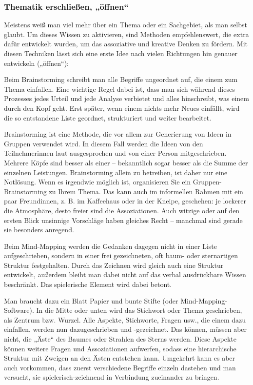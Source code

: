 \documentclass[]{article}
\begin{document}
\subsubsection{Thematik erschließen,
„öffnen``}\label{thematik-erschlieen-offnen}

Meistens weiß man viel mehr über ein Thema oder ein Sachgebiet, als man
selbst glaubt. Um dieses Wissen zu aktivieren, sind Methoden
empfehlenswert, die extra dafür entwickelt wurden, um das assoziative
und kreative Denken zu fördern. Mit diesen Techniken lässt sich eine
erste Idee nach vielen Richtungen hin genauer entwickeln („öffnen``):

Beim Brainstorming schreibt man alle Begriffe ungeordnet auf, die einem
zum Thema einfallen. Eine wichtige Regel dabei ist, dass man sich
während dieses Prozesses jedes Urteil und jede Analyse verbietet und
alles hinschreibt, was einem durch den Kopf geht. Erst später, wenn
einem nichts mehr Neues einfällt, wird die so entstandene Liste
geordnet, strukturiert und weiter bearbeitet.

Brainstorming ist eine Methode, die vor allem zur Generierung von Ideen
in Gruppen verwendet wird. In diesem Fall werden die Ideen von den
Teilnehmerinnen laut ausgesprochen und von einer Person mitgeschrieben.
Mehrere Köpfe sind besser als einer -- bekanntlich sogar besser als die
Summe der einzelnen Leistungen. Brainstorming allein zu betreiben, ist
daher nur eine Notlösung. Wenn es irgendwie möglich ist, organisieren
Sie ein Gruppen-Brainstorming zu Ihrem Thema. Das kann auch im
informellen Rahmen mit ein paar Freundinnen, z. B. im Kaffeehaus oder in
der Kneipe, geschehen: je lockerer die Atmosphäre, desto freier sind die
Assoziationen. Auch witzige oder auf den ersten Blick unsinnige
Vorschläge haben gleiches Recht -- manchmal sind gerade sie besonders
anregend.

Beim Mind-Mapping werden die Gedanken dagegen nicht in einer Liste
aufgeschrieben, sondern in einer frei gezeichneten, oft baum- oder
sternartigen Struktur festgehalten. Durch das Zeichnen wird gleich auch
eine Struktur entwickelt, außerdem bleibt man dabei nicht auf das verbal
ausdrückbare Wissen beschränkt. Das spielerische Element wird dabei
betont.

Man braucht dazu ein Blatt Papier und bunte Stifte (oder
Mind-Mapping-Software). In die Mitte oder unten wird das Stichwort oder
Thema geschrieben, als Zentrum bzw. Wurzel. Alle Aspekte, Stichworte,
Fragen usw., die einem dazu einfallen, werden nun dazugeschrieben und
-gezeichnet. Das können, müssen aber nicht, die „Äste`` des Baumes oder
Strahlen des Sterns werden. Diese Aspekte können weitere Fragen und
Assoziationen aufwerfen, sodass eine hierarchische Struktur mit Zweigen
an den Ästen entstehen kann. Umgekehrt kann es aber auch vorkommen, dass
zuerst verschiedene Begriffe einzeln dastehen und man versucht, sie
spielerisch-zeichnend in Verbindung zueinander zu bringen.
\end{document}
